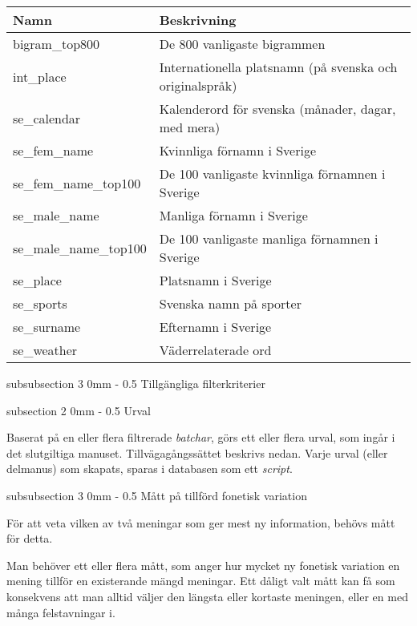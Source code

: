 \documentclass[11pt, a4paper, twoside]{article}
\makeatletter
\renewcommand{\subsubsection}{\@startsection
  {subsubsection}%
  {3}%
  {0mm}%
  {-\baselineskip}%
  {0.5\baselineskip}%
  {\bfseries\sffamily}}%
\renewcommand{\subsection}{\@startsection
  {subsection}%
  {2}%
  {0mm}%
  {-\baselineskip}%
  {0.5\baselineskip}%
  {\bfseries\sffamily\large}}%
\makeatother
\begin{document}
\begin{tabular}{ll}
  \bf Namn & \bf Beskrivning\\\hline
  bigram\_top800 & De 800 vanligaste bigrammen\\
  int\_place & Internationella platsnamn (på svenska och originalspråk) \\
  se\_calendar & Kalenderord för svenska (månader, dagar, med mera) \\
  se\_fem\_name & Kvinnliga förnamn i Sverige\\
  se\_fem\_name\_top100 & De 100 vanligaste kvinnliga förnamnen i Sverige\\
  se\_male\_name & Manliga förnamn i Sverige\\
  se\_male\_name\_top100 & De 100 vanligaste manliga förnamnen i Sverige\\
  se\_place & Platsnamn i Sverige\\
  se\_sports & Svenska namn på sporter \\
  se\_surname & Efternamn i Sverige \\
  se\_weather & Väderrelaterade ord 
\end{tabular}


\subsubsection{Tillgängliga filterkriterier}



\subsection{Urval}

Baserat på en eller flera filtrerade {\em batchar}, görs ett eller flera urval, som ingår i det slutgiltiga manuset. Tillvägagångssättet beskrivs nedan. Varje urval (eller delmanus) som skapats, sparas i databasen som ett {\em script}.

\subsubsection{Mått på tillförd fonetisk variation}

För att veta vilken av två meningar som ger mest ny information, behövs mått för detta.

Man behöver ett eller flera mått, som anger hur mycket ny fonetisk variation en mening tillför en existerande mängd meningar. Ett dåligt valt mått kan få som konsekvens att man alltid väljer den längsta eller kortaste meningen, eller en med många felstavningar i.
\end{document}
